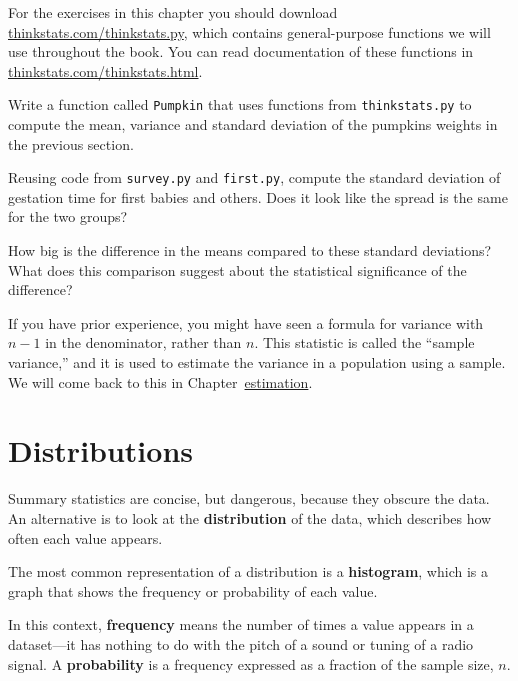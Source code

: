 \documentclass[12pt]{book}
\begin{document}
\begin{exercise}
For the exercises in this chapter you should download
\url{thinkstats.com/thinkstats.py}, which contains general-purpose
functions we will use throughout the book.  You can read documentation
of these functions in \url{thinkstats.com/thinkstats.html}.


Write a function called
{\tt Pumpkin} that uses functions from {\tt thinkstats.py} to compute
the mean, variance and standard deviation of the pumpkins weights in
the previous section.
\end{exercise}

\begin{exercise}
Reusing code from {\tt survey.py} and {\tt first.py}, compute the
standard deviation of gestation time for first babies and others.
Does it look like the spread is the same for the two groups?


How big is the difference in the means compared to these standard
deviations?  What does this comparison suggest about the statistical
significance of the difference?
\end{exercise}

If you have prior experience, you might have seen a 
formula for variance with $n-1$ in the denominator, rather than $n$.
This statistic is called the ``sample variance,'' and it is used
to estimate the variance in a population using a sample.  We will
come back to this in Chapter~\url{estimation}.


\section{Distributions}
\label{distributions}

Summary statistics are concise, but dangerous, because they obscure
the data.  An alternative is to look at the {\bf distribution} of the
data, which describes how often each value appears.

The most common representation of a distribution is a {\bf histogram},
which is a graph that shows the frequency or probability
of each value.


In this context, {\bf frequency} means the number of times a value
appears in a dataset---it has nothing to do with the pitch of a sound
or tuning of a radio signal.  A {\bf probability} is a frequency expressed
as a fraction of the sample size, $n$.
\end{document}
